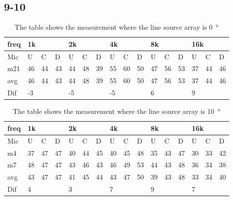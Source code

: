 \subsection{9-10}

\begin{table}[H]
\centering
\caption{The table shows the measurement where the line source array is \SI{0}{\degree}}
\begin{tabular}{l|l|l|l|l|l|l|l|l|l|l|l|l|lll}
freq & \multicolumn{3}{l|}{1k} & \multicolumn{3}{l|}{2k} & \multicolumn{3}{l|}{4k} & \multicolumn{3}{l|}{8k} & \multicolumn{3}{l}{16k}                                \\ \hline
Mic  & U      & C      & D     & U      & C      & D     & U      & C      & D     & U      & C      & D     & \multicolumn{1}{l|}{U}  & \multicolumn{1}{l|}{C}  & D  \\ \hline
m21  & 46     & 44     & 43    & 44     & 48     & 39    & 55     & 60     & 50    & 47     & 56     & 53    & \multicolumn{1}{l|}{37} & \multicolumn{1}{l|}{44} & 46 \\ \hline
avg  & 46     & 44     & 43    & 44     & 48     & 39    & 55     & 60     & 50    & 47     & 56     & 53    & \multicolumn{1}{l|}{37} & \multicolumn{1}{l|}{44} & 46 \\ \hline  
Dif & \multicolumn{3}{l|}{-3} & \multicolumn{3}{l|}{-5} & \multicolumn{3}{l|}{-5} & \multicolumn{3}{l|}{6} & \multicolumn{3}{l}{9}                                
\end{tabular}
\end{table}

\begin{table}[H]
\centering
\caption{The table shows the measurement where the line source array is \SI{10}{\degree}}
\begin{tabular}{l|l|l|l|l|l|l|l|l|l|l|l|l|lll}
freq & \multicolumn{3}{l|}{1k} & \multicolumn{3}{l|}{2k} & \multicolumn{3}{l|}{4k} & \multicolumn{3}{l|}{8k} & \multicolumn{3}{l}{16k}                                \\ \hline
Mic  & U      & C      & D     & U      & C      & D     & U      & C      & D     & U      & C      & D     & \multicolumn{1}{l|}{U}  & \multicolumn{1}{l|}{C}  & D  \\ \hline
m4    & 37     & 47     &  47    &  40    &  44    &   45   &  40    &  45     &  48    &  35     & 43     &  47    & \multicolumn{1}{l|}{30} & \multicolumn{1}{l|}{33} & 42 \\
m7    & 48     & 47     &  47    &   43   &   46   &  43    &  46    &  49     &  53    &  44     & 43     & 48     & \multicolumn{1}{l|}{36} & \multicolumn{1}{l|}{34} & 38 \\ \hline
avg &  43    &  47    & 47     &  41    &  45    & 44     & 43     &   47    &   50   &  39     & 43     &  48    & \multicolumn{1}{l|}{33} & \multicolumn{1}{l|}{34}  & 40  \\ \hline  
Dif & \multicolumn{3}{l|}{4} & \multicolumn{3}{l|}{3} & \multicolumn{3}{l|}{7} & \multicolumn{3}{l|}{9} & \multicolumn{3}{l}{7}                                
\end{tabular}
\end{table}


